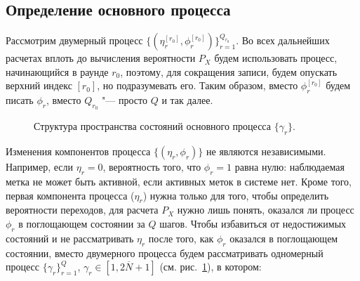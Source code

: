 \subsection{Определение основного процесса}

Рассмотрим двумерный процесс $\{ (\eta_r^{[r_0]}, \phi_r^{[r_0]}) \}_{r=1}^{Q_{r_0}}$. Во всех дальнейших расчетах вплоть до вычисления вероятности $P_X$ будем использовать процесс, начинающийся в раунде $r_0$, поэтому, для сокращения записи, будем опускать верхний индекс $[r_0]$, но подразумевать его. Таким образом, вместо $\phi_r^{[r_0]}$ будем писать $\phi_r$, вместо $Q_{r_0}$ "--- просто $Q$ и так далее.

\begin{figure}[htb]
  \caption{Структура пространства состояний основного процесса $\{\gamma_r\}$.}
  \label{fig:ch3_fg_structure}
\end{figure}

Изменения компонентов процесса $\{ (\eta_r, \phi_r) \}$ не являются независимыми. Например, если $\eta_r = 0$, вероятность того, что $\phi_r = 1$ равна нулю: наблюдаемая метка не может быть активной, если активных меток в системе нет. Кроме того, первая компонента процесса ($\eta_r$) нужна только для того, чтобы определить вероятности переходов, для расчета $P_X$ нужно лишь понять, оказался ли процесс $\phi_r$ в поглощающем состоянии за $Q$ шагов. Чтобы избавиться от недостижимых состояний и не рассматривать $\eta_r$ после того, как $\phi_r$ оказался в поглощающем состоянии, вместо двумерного процесса будем рассматривать одномерный процесс $\{ \gamma_r \}_{r=1}^Q$, $\gamma_r \in [1, 2\overline{N}+1]$ (см. рис.~\ref{fig:ch3_fg_structure}), в котором:

